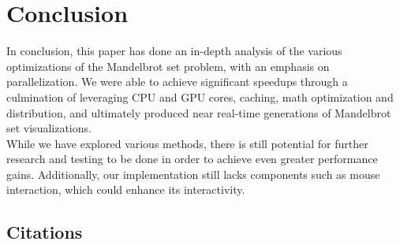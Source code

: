 \documentclass{article}
\begin{document}
\section{Conclusion}

In conclusion, this paper has done an in-depth analysis of the various optimizations of the Mandelbrot set problem, with an emphasis on parallelization. We were able to achieve significant speedups through a culmination of leveraging CPU and GPU cores, caching, math optimization and distribution, and ultimately produced near real-time generations of Mandelbrot set visualizations. \\

While we have explored various methods, there is still potential for further research and testing to be done in order to achieve even greater performance gains. Additionally, our implementation still lacks components such as mouse interaction, which could enhance its interactivity.

\pagebreak

\begin{center}

\section*{Citations}

\end{center}
\end{document}
